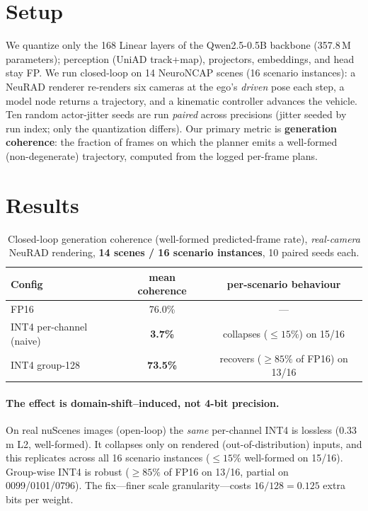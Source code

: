 \documentclass[conference]{IEEEtran}
\begin{document}
\section{Setup}
We quantize only the 168 Linear layers of the Qwen2.5-0.5B backbone (357.8\,M parameters);
perception (UniAD track+map), projectors, embeddings, and head stay FP. We run closed-loop on
14 NeuroNCAP scenes (16 scenario instances): a NeuRAD renderer re-renders six cameras at
the ego's \emph{driven} pose each step, a model node returns a trajectory, and a kinematic controller
advances the vehicle. Ten random actor-jitter seeds are run \emph{paired} across precisions
(jitter seeded by run index; only the quantization differs). Our primary metric is
\textbf{generation coherence}: the fraction of frames on which the planner emits a well-formed
(non-degenerate) trajectory, computed from the logged per-frame plans.

\section{Results}
\begin{table}[t]\centering
\caption{Closed-loop generation coherence (well-formed predicted-frame rate), \emph{real-camera}
NeuRAD rendering, \textbf{14 scenes / 16 scenario instances}, 10 paired seeds each.}
\begin{tabular}{lcc}
\toprule
Config & mean coherence & per-scenario behaviour \\
\midrule
FP16                       & 76.0\%          & --- \\
INT4 per-channel (naive)   & \textbf{3.7\%}  & collapses ($\le 15\%$) on 15/16 \\
INT4 group-128             & \textbf{73.5\%} & recovers ($\ge 85\%$ of FP16) on 13/16 \\
\bottomrule
\end{tabular}
\end{table}

\paragraph{The effect is domain-shift--induced, not 4-bit precision.} On real nuScenes images
(open-loop) the \emph{same} per-channel INT4 is lossless (0.33\,m L2, well-formed). It collapses
only on rendered (out-of-distribution) inputs, and this replicates across all 16 scenario instances
($\le 15\%$ well-formed on 15/16). Group-wise INT4 is robust ($\ge 85\%$ of FP16 on 13/16,
partial on 0099/0101/0796). The fix---finer scale granularity---costs $16/128 = 0.125$ extra bits
per weight.
\end{document}
